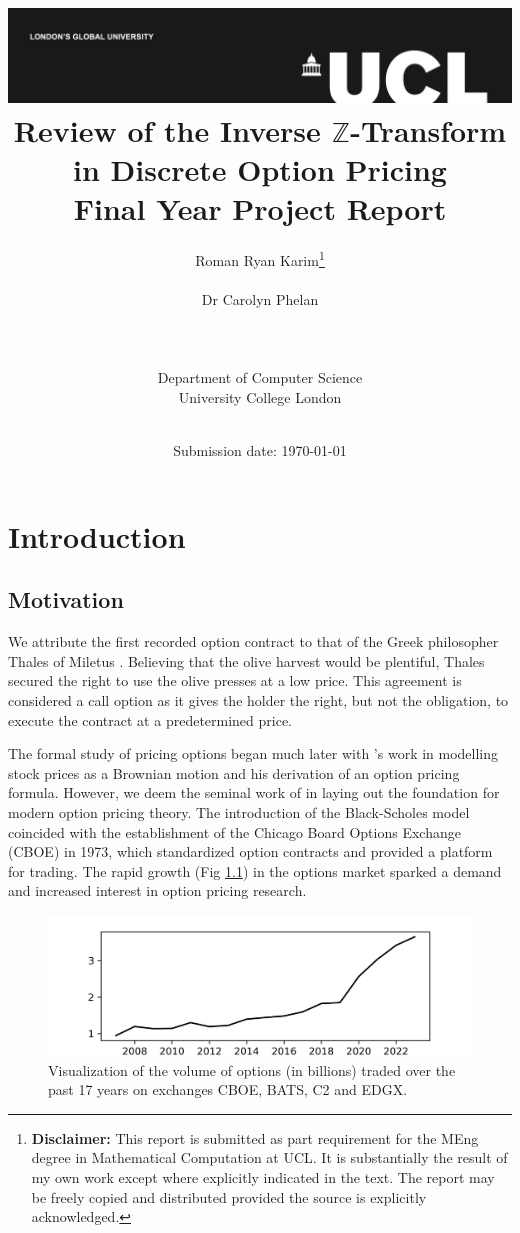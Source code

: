 \documentclass[a4paper]{report}
\title{{\vspace{-14em} \includegraphics[scale=0.4]{Logos/ucl_logo.png}}\\
{{\vspace{2em} \Huge Review of the Inverse $\mathbb{Z}$-Transform in Discrete Option Pricing}}\\
{\large Final Year Project Report}\\
}
\date{Submission date: \today}
\author{Roman Ryan Karim\thanks{
{\bf Disclaimer:}
This report is submitted as part requirement for the MEng degree in Mathematical Computation at UCL. It is substantially the result of my own work except where explicitly indicated in the text. The report may be freely copied and distributed provided the source is explicitly acknowledged.}
\\ \\ Dr Carolyn Phelan
\\ \\ \\ \\ Department of Computer Science
\\ University College London
\\ \\
}
\begin{document}
 
\onehalfspacing
\maketitle
\begin{abstract}

\end{abstract}

\tableofcontents
\setcounter{page}{1}

\chapter{Introduction}
\section{Motivation}
We attribute the first recorded option contract to that of the Greek philosopher Thales of Miletus \citep{thompson1994aristotle}. Believing that the olive harvest would be plentiful, Thales secured the right to use the olive presses at a low price. This agreement is considered a call option as it gives the holder the right, but not the obligation, to execute the contract at a predetermined price.

The formal study of pricing options began much later with \citet{bachelier1900theorie}'s work in modelling stock prices as a Brownian motion and his derivation of an option pricing formula. However, we deem the seminal work of \citet{black1973pricing} in laying out the foundation for modern option pricing theory. The introduction of the Black-Scholes model coincided with the establishment of the Chicago Board Options Exchange (CBOE) in 1973, which standardized option contracts and provided a platform for trading. The rapid growth (Fig \ref{fig:volume_of_options}) in the options market sparked a demand and increased interest in option pricing research.

\begin{figure}[h]
	\centering
	\includegraphics[width=0.7\linewidth]{images/options_volume.png}
	\captionsetup{justification=centering}
    \caption{Visualization of the volume of options (in billions) traded over the past 17 years on exchanges CBOE, BATS, C2 and EDGX.}
    \label{fig:volume_of_options}
\end{figure}
\end{document}
